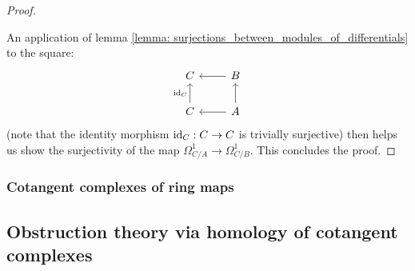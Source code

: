\begin{proof}
\begin{itemize}
                        \end{itemize}
                    An application of lemma \ref{lemma: surjections_between_modules_of_differentials} to the square:
                        $$
                            \begin{tikzcd}
                            	C & B \\
                            	C & A
                            	\arrow["{\id_C}", from=2-1, to=1-1]
                            	\arrow[from=2-2, to=1-2]
                            	\arrow[from=1-2, to=1-1]
                            	\arrow[from=2-2, to=2-1]
                            \end{tikzcd}
                        $$
                    (note that the identity morphism $\mathrm{id}_C: C \to C$ is trivially surjective) then helps us show the surjectivity of the map $\Omega^1_{C/A} \to \Omega^1_{C/B}$. This concludes the proof.
                \end{proof}
                
        \subsubsection{Cotangent complexes of ring maps}

    \subsection{Obstruction theory via homology of cotangent complexes}
